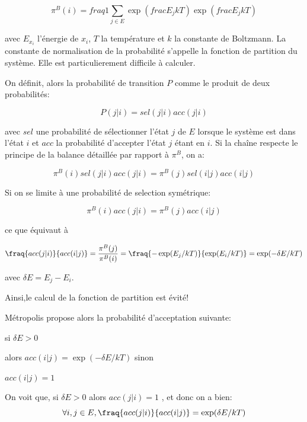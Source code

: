 \begin{equation}
\pi^B(i) = fraq{1}{\sum_{j \in E}\exp(frac{E_j}{kT})} \exp(frac{E_j}{kT})
\end{equation}

avec $E_{x_i}$  l'énergie de $x_i$, $T$ la température et $k$ la constante de Boltzmann. La constante de normalisation de la probabilité s'appelle la fonction de partition du système. Elle est particulierement difficile à calculer.

On définit, alors la probabilité de transition $P$ comme le produit de deux probabilités:

\begin{equation}
  \label{decomp_Metro}
P (j|i) = sel(j|i)acc(j|i)
\end{equation}

avec $sel$ une probabilité de sélectionner l'état $j$ de $E$ lorsque le système est dans l'état $i$ et $acc$ la probabilité d'accepter l'état $j$ étant en $i$. Si la chaîne respecte le principe de la balance détaillée par rapport à $\pi^B$, on a:

\begin{equation}
  \label{balance}
\pi^B(i)sel(j|i)acc(j|i) = \pi^B(j)sel(i|j)acc(i|j) 
\end{equation}

Si on se limite à une probabilité de selection symétrique:

\begin{equation}
\pi^B(i)acc(j|i) = \pi^B(j)acc(i|j) 
\end{equation}

ce que équivaut à

\begin{equation}
  \label{fraq_Metropolis}
\fraq{acc(j|i)}{acc(i|j)} =\frac{\pi^B(j)}{\pi^B(i)} = \fraq{-\exp(E_j/kT)}{\exp(E_i/kT)} = \exp(-\delta E/kT) 
\end{equation}

avec $\delta E =  E_j - E_i$.

Ainsi,le calcul de la fonction de partition est évité!

Métropolis propose alors la probabilité d'acceptation suivante:


si $\delta E >0$

alors $acc(i|j) = \exp(- \delta E/kT)$
sinon

$acc(i|j)=1$

On voit que, si $\delta E >0$ alors $acc(j|i)=1$ , et donc  on a bien:
\begin{equation}
\forall i,j \in E ,\fraq{acc(j|i)}{acc(i|j)} = \exp(\delta E/kT)
\end{equation}

